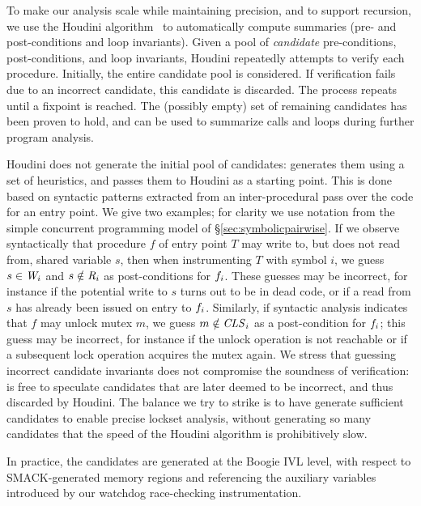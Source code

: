 To make our analysis scale while maintaining precision, and to support recursion, we use the Houdini algorithm~\cite{flanagan2001houdini} to automatically compute summaries (pre- and post-conditions and loop invariants).  Given a pool of \emph{candidate} pre-conditions, post-conditions, and loop invariants, Houdini repeatedly attempts to verify each procedure.  Initially, the entire candidate pool is considered.  If verification fails due to an incorrect candidate, this candidate is discarded.  The process repeats until a fixpoint is reached.  The (possibly empty) set of remaining candidates has been proven to hold, and can be used to summarize calls and loops during further program analysis.

Houdini does not generate the initial pool of candidates: \whoop generates them using a set of heuristics, and passes them to Houdini as a starting point.  This is done based on syntactic patterns extracted from an inter-procedural pass over the code for an entry point.  We give two examples; for clarity we use notation from the simple concurrent programming model of \S\ref{sec:symbolicpairwise}.  If we observe syntactically that procedure $f$ of entry point $T$ may write to, but does not read from, shared variable $s$, then when instrumenting $T$ with symbol $i$, we guess $s \in \mathit{W}_{i}$ and $s \notin\mathit{R}_{i}$ as post-conditions for $f_{i}$.  These guesses may be incorrect, for instance if the potential write to $s$ turns out to be in dead code, or if a read from $s$ has already been issued on entry to $f_{i}$.  Similarly, if syntactic analysis indicates that $f$ may unlock mutex $m$, we guess $m \notin \mathit{CLS}_{i}$ as a post-condition for $f_{i}$; this guess may be incorrect, for instance if the unlock operation is not reachable or if a subsequent lock operation acquires the mutex again.  We stress that guessing incorrect candidate invariants does not compromise the soundness of verification: \whoop is free to speculate candidates that are later deemed to be incorrect, and thus discarded by Houdini.  The balance we try to strike is to have \whoop generate sufficient candidates to enable precise lockset analysis, without generating so many candidates that the speed of the Houdini algorithm is prohibitively slow.

In practice, the candidates are generated at the Boogie IVL level, with respect to SMACK-generated memory regions and referencing the auxiliary variables introduced by our watchdog race-checking instrumentation.


